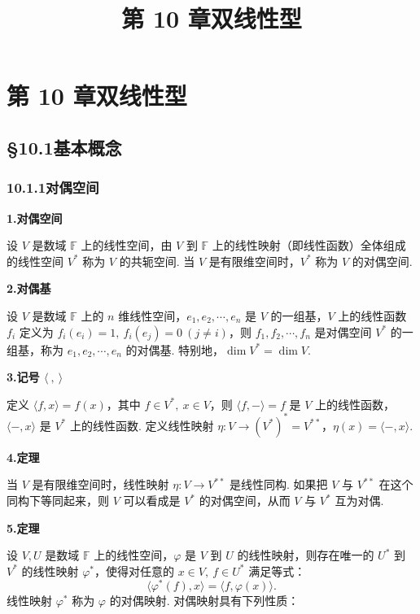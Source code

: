 \documentclass[UTF8, 12pt, fontset=fandol, oneside]{ctexart}
\title{第 10 章\quad 双线性型}
\author{}
\date{}
\begin{document}
\maketitle

\section*{第 10 章\quad 双线性型}

\subsection*{§10.1\quad 基本概念}

\subsubsection*{10.1.1\quad 对偶空间}

\noindent\textbf{1.\quad 对偶空间}

设 $V$ 是数域 $\mathbb{F}$ 上的线性空间，由 $V$ 到 $\mathbb{F}$ 上的线性映射（即线性函数）全体组成的线性空间 $V^*$ 称为 $V$ 的共轭空间. 当 $V$ 是有限维空间时，$V^*$ 称为 $V$ 的对偶空间.

\noindent\textbf{2.\quad 对偶基}

设 $V$ 是数域 $\mathbb{F}$ 上的 $n$ 维线性空间，$e_1,e_2,\cdots,e_n$ 是 $V$ 的一组基，$V$ 上的线性函数 $f_i$ 定义为 $f_i(e_i)=1,\ f_i(e_j)=0\ (j\ne i)$，则 $f_1,f_2,\cdots,f_n$ 是对偶空间 $V^*$ 的一组基，称为 $e_1,e_2,\cdots,e_n$ 的对偶基. 特别地，$\dim V^*=\dim V$.

\noindent\textbf{3.\quad 记号 $\langle\ ,\ \rangle$}

定义 $\langle f,x\rangle=f(x)$，其中 $f\in V^*,\ x\in V$，则 $\langle f,-\rangle=f$ 是 $V$ 上的线性函数，$\langle -,x\rangle$ 是 $V^*$ 上的线性函数. 定义线性映射 $\eta:V\to (V^*)^*=V^{**}$，$\eta(x)=\langle -,x\rangle$.

\noindent\textbf{4.\quad 定理}

当 $V$ 是有限维空间时，线性映射 $\eta:V\to V^{**}$ 是线性同构. 如果把 $V$ 与 $V^{**}$ 在这个同构下等同起来，则 $V$ 可以看成是 $V^*$ 的对偶空间，从而 $V$ 与 $V^*$ 互为对偶.

\noindent\textbf{5.\quad 定理}

设 $V,U$ 是数域 $\mathbb{F}$ 上的线性空间，$\varphi$ 是 $V$ 到 $U$ 的线性映射，则存在唯一的 $U^*$ 到 $V^*$ 的线性映射 $\varphi^*$，使得对任意的 $x\in V,\ f\in U^*$ 满足等式：
\begin{equation}
\langle \varphi^*(f),x\rangle=\langle f,\varphi(x)\rangle .
\tag{10.1}
\end{equation}
线性映射 $\varphi^*$ 称为 $\varphi$ 的对偶映射. 对偶映射具有下列性质：
\end{document}
